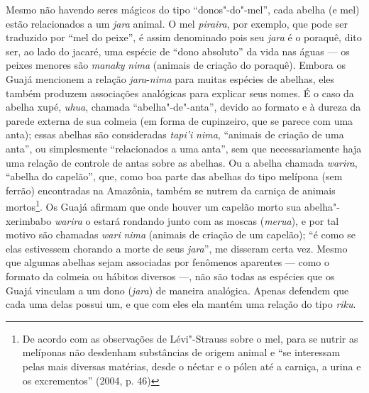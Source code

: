 Mesmo não havendo seres mágicos do tipo ``donos"-do"-mel'', cada abelha (e
mel) estão relacionados a um \emph{jara} animal. O mel \emph{piraira},
por exemplo, que pode ser traduzido por ``mel do peixe'', é assim
denominado pois seu \emph{jara} é o poraquê, dito ser, ao lado do
jacaré, uma espécie de ``dono absoluto'' da vida nas águas --- os peixes
menores são \emph{manaky} \emph{nima} (animais de criação do poraquê).
Embora os Guajá mencionem a relação \emph{jara}-\emph{nima} para muitas
espécies de abelhas, eles também produzem associações analógicas para
explicar seus nomes. É o caso da abelha xupé, \emph{uhua}, chamada
``abelha"-de"-anta'', devido ao formato e à dureza da parede externa de sua
colmeia (em forma de cupinzeiro, que se parece com uma anta); essas
abelhas são consideradas \emph{tapi'i} \emph{nima}, ``animais de criação
de uma anta'', ou simplesmente ``relacionados a uma anta'', sem que
necessariamente haja uma relação de controle de antas sobre as abelhas.
Ou a abelha chamada \emph{warira}, ``abelha do capelão'', que, como boa
parte das abelhas do tipo melípona (sem ferrão) encontradas na Amazônia,
também se nutrem da carniça de animais mortos\footnote{De acordo com as
  observações de Lévi"-Strauss sobre o mel, para se nutrir as melíponas
  não desdenham substâncias de origem animal e ``se interessam pelas mais
diversas matérias, desde o néctar e o pólen até a carniça, a urina e
os excrementos'' (2004, p. 46)}. Os Guajá afirmam que onde houver um
capelão morto sua abelha"-xerimbabo \emph{warira} o estará rondando junto
com as moscas (\emph{merua}), e por tal motivo são chamadas \emph{wari}
\emph{nima} (animais de criação de um capelão); ``é como se elas
estivessem chorando a morte de seus \emph{jara}'', me disseram certa vez.
Mesmo que algumas abelhas sejam associadas por fenômenos aparentes ---
como o formato da colmeia ou hábitos diversos ---, não são todas as
espécies que os Guajá vinculam a um dono (\emph{jara}) de maneira
analógica. Apenas defendem que cada uma delas possui um, e que com eles
ela mantém uma relação do tipo \emph{riku}.

